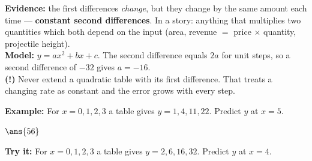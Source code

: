 \documentclass[12pt]{article}
\begin{document}
\begin{formulabox}
\textbf{Evidence:} the first differences \emph{change}, but they change by the
same amount each time --- \textbf{constant second differences}. In a story:
anything that multiplies two quantities which both depend on the input
(area, revenue $=$ price $\times$ quantity, projectile height).\\[3pt]
\textbf{Model:} $y = ax^2 + bx + c$. The second difference equals $2a$ for
unit steps, so a second difference of $-32$ gives $a = -16$.\\[3pt]
\textbf{(!)} Never extend a quadratic table with its first difference. That
treats a changing rate as constant and the error grows with every step.
\end{formulabox}
\begin{examplebox}
\textbf{Example:} For $x = 0, 1, 2, 3$ a table gives $y = 1, 4, 11, 22$.
Predict $y$ at $x = 5$.
\par
$\ans{56}$
\end{examplebox}
\begin{tryitbox}
\textbf{Try it:} For $x = 0, 1, 2, 3$ a table gives $y = 2, 6, 16, 32$. Predict
$y$ at $x = 4$.\\[2pt]
\end{tryitbox}
\end{document}
